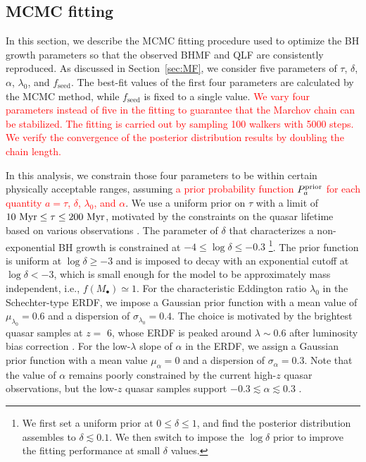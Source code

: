 \documentclass[twocolumn, twocolappendix]{aastex63}
\newcommand{\tlife}{\tau}
\newcommand{\fseed}{f_\mathrm{seed}}
\newcommand{\red}[1]{\textcolor{red}{ #1}}
\begin{document}
\begin{CJK*}{UTF8}{gbsn}
\vspace{2mm}
\subsection{MCMC fitting}\label{sec:fitting}



In this section, we describe the MCMC fitting procedure used to optimize 
the BH growth parameters so that the observed BHMF and QLF are consistently reproduced. 
As discussed in Section~\ref{sec:MF}, we consider five parameters of $\tlife$, $\delta$, $\alpha$, $\lambda_0$, and $\fseed$.
The best-fit values of the first four parameters are calculated by the MCMC method, while $\fseed$ is fixed to a single value.
\red{
We vary four parameters instead of five in the fitting to guarantee that the Marchov chain can be stabilized. 
The fitting is carried out by sampling 100 walkers with 5000 steps.
We verify the convergence of the posterior distribution results by doubling the chain length.
}

In this analysis, we constrain those four parameters to be within certain physically acceptable ranges, 
assuming \red{a prior probability function $P^{\rm prior}_a$ for each quantity $a=\tlife$, $\delta$, $\lambda_0$, and $\alpha$}.
We use a uniform prior on $\tlife$ with a limit of $10~{\rm Myr} \leq \tlife \leq 200~{\rm Myr}$,
motivated by the constraints on the quasar lifetime based on various observations
\citep[e.g.,][]{2004cbhg.symp..169M}.
The parameter of $\delta$ that characterizes a non-exponential BH growth 
is constrained at $-4 \leq \log \delta \leq -0.3$
\footnote[4]{ We first set a uniform prior at $0\leq \delta \leq 1$, 
and find the posterior distribution assembles to $\delta \lesssim 0.1$.
We then switch to impose the $\log \delta$ prior to improve the fitting performance at small $\delta$ values.}.
The prior function is uniform at $\log \delta \geq -3$ and is imposed to decay with an exponential cutoff at $\log \delta < -3$,
which is small enough for the model to be approximately mass independent, i.e., $f(M_\bullet)\simeq1$.
For the characteristic Eddington ratio $\lambda_0$ in the Schechter-type ERDF, 
we impose a Gaussian prior function with a mean value of $\mu_{\lambda_0}=0.6$ and a dispersion of $\sigma_{\lambda_0}=0.4$.
The choice is motivated by the brightest quasar samples at $z=$ 6, whose ERDF is peaked around $\lambda \sim 0.6$ 
after luminosity bias correction \citep[e.g.,][]{2010AJ....140..546W}.
For the low-$\lambda$ slope of $\alpha$ in the ERDF, we assign a Gaussian prior function with a mean value 
$\mu_{\alpha}=0$ and a dispersion of $\sigma_{\alpha}=0.3$.
Note that the value of $\alpha$ remains poorly constrained by the current high-$z$ quasar observations,
but the low-$z$ quasar samples support $-0.3 \lesssim \alpha \lesssim 0.3$ \citep[e.g., see Figure 21 in][]{2015MNRAS.447.2085S}.



\end{CJK*}
\end{document}
